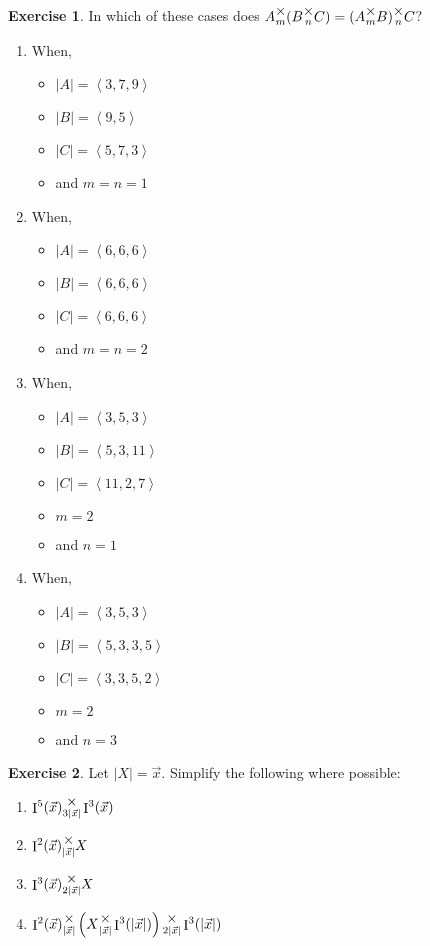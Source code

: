 \documentclass[12pt]{book}
\theoremstyle{plain}
\theoremstyle{definition}
\newtheorem{exercise}{Exercise}[chapter]
\theoremstyle{ppart}
\theoremstyle{case}
\theoremstyle{solution}
\DeclareMathOperator{\Ident}{I}
\newcommand{\mmult}[1]{\text{\raisebox{1ex}{$\underset{#1}{\times}$}}}
\begin{document}
\begin{exercise}
In which of these cases does $A \mmult{m} (B \mmult{n} C) = (A \mmult{m} B) \mmult{n} C$?
\begin{enumerate}
\item When,
	\begin{itemize}
		\item $|A| = \left<3, 7, 9\right>$
		\item $|B| = \left<9, 5\right>$
		\item $|C| = \left<5, 7, 3\right>$
		\item and $m = n = 1$
	\end{itemize}
\item When,
	\begin{itemize}
		\item $|A| = \left<6, 6, 6\right>$
		\item $|B| = \left<6, 6, 6\right>$
		\item $|C| = \left<6, 6, 6\right>$
		\item and $m = n = 2$
	\end{itemize}
\item When,
	\begin{itemize}
		\item $|A| = \left<3, 5, 3\right>$
		\item $|B| = \left<5, 3, 11\right>$
		\item $|C| = \left<11, 2, 7\right>$
		\item $m = 2$
		\item and $n = 1$
	\end{itemize}
\item When,
	\begin{itemize}
		\item $|A| = \left<3, 5, 3\right>$
		\item $|B| = \left<5, 3, 3, 5\right>$
		\item $|C| = \left<3, 3, 5, 2\right>$
		\item $m = 2$
		\item and $n = 3$
	\end{itemize}
\end{enumerate}
\end{exercise}

\begin{exercise}
Let $|X| = \vec{x}$. Simplify the following where possible:
\begin{enumerate}
\item $\Ident^5(\vec{x}) \mmult{3 |\vec{x}|} \Ident^3(\vec{x})$
\item $\Ident^2(\vec{x}) \mmult{|\vec{x}|} X$
\item $\Ident^3(\vec{x}) \mmult{2|\vec{x}|} X$
\item $\Ident^2(\vec{x}) \mmult{|\vec{x}|} \left(X \mmult{|\vec{x}|} \Ident^3(|\vec{x}|)
				\right) \mmult{2|\vec{x}|} \Ident^3(|\vec{x}|)$
\end{enumerate}
\end{exercise}
\end{document}
